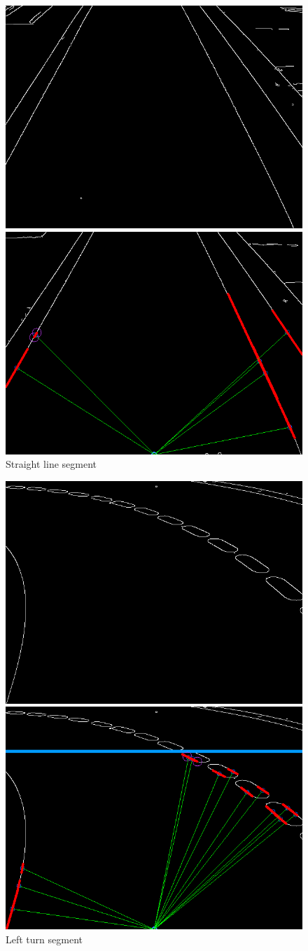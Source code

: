 \documentclass [10pt]{article}
\begin{document}
 \begin{figure}[h]
\centering
\begin{subfig}
  \centering
  \includegraphics[width=.4\linewidth]{figures/straight_canny.png}
\end{subfig}%
\begin{subfig}
  \centering
  \includegraphics[width=.4\linewidth]{figures/straight_h.png}
\end{subfig}
\caption{Straight line segment}
\label{fig:Fig2}
\end{figure}


\begin{figure}[h]
\centering
\begin{subfig}
  \centering
  \includegraphics[width=.4\linewidth]{figures/left_c.png}
\end{subfig}%
\begin{subfig}
  \centering
  \includegraphics[width=.4\linewidth]{figures/left_h.png}
\end{subfig}
\caption{Left turn segment}
\label{fig:Fig3}
\end{figure}
\end{document}
